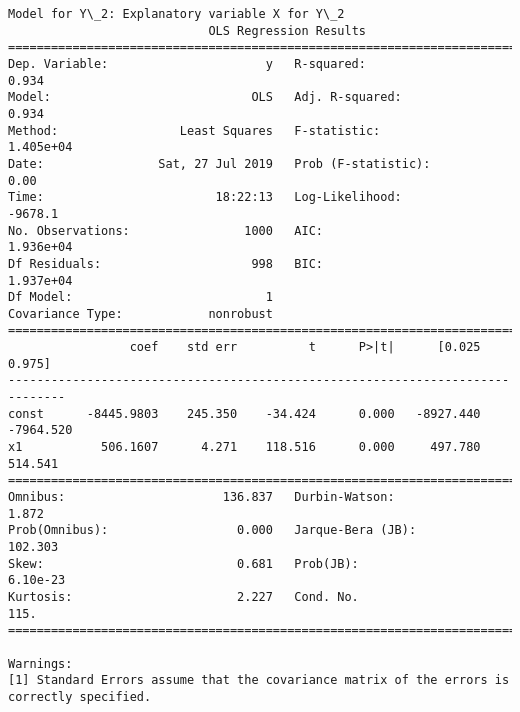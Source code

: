 \documentclass[11pt]{article}
\begin{document}
\begin{Verbatim}[commandchars=\\\{\}]
Model for Y\_2: Explanatory variable X for Y\_2
                            OLS Regression Results                            
==============================================================================
Dep. Variable:                      y   R-squared:                       0.934
Model:                            OLS   Adj. R-squared:                  0.934
Method:                 Least Squares   F-statistic:                 1.405e+04
Date:                Sat, 27 Jul 2019   Prob (F-statistic):               0.00
Time:                        18:22:13   Log-Likelihood:                -9678.1
No. Observations:                1000   AIC:                         1.936e+04
Df Residuals:                     998   BIC:                         1.937e+04
Df Model:                           1                                         
Covariance Type:            nonrobust                                         
==============================================================================
                 coef    std err          t      P>|t|      [0.025      0.975]
------------------------------------------------------------------------------
const      -8445.9803    245.350    -34.424      0.000   -8927.440   -7964.520
x1           506.1607      4.271    118.516      0.000     497.780     514.541
==============================================================================
Omnibus:                      136.837   Durbin-Watson:                   1.872
Prob(Omnibus):                  0.000   Jarque-Bera (JB):              102.303
Skew:                           0.681   Prob(JB):                     6.10e-23
Kurtosis:                       2.227   Cond. No.                         115.
==============================================================================

Warnings:
[1] Standard Errors assume that the covariance matrix of the errors is correctly specified.



\end{Verbatim}
\end{document}

